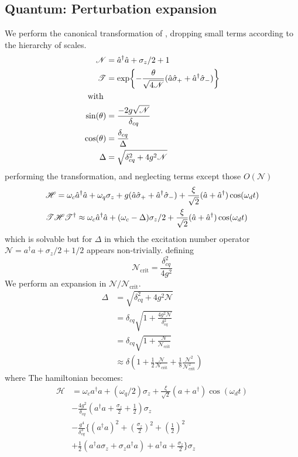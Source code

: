 \subsection{Quantum: Perturbation expansion}
We perform the canonical transformation of \cite{Carbonaro1979}, dropping small terms according to the hierarchy of scales.
\begin{align*}
  \mathscr{N} &= {\hat{a}^\dagger} \hat{a} + \sigma_z/2+ 1\\
  \mathscr{T} &= \exp{-\frac{\theta}{\sqrt{4\mathscr{N}}} (\hat{a}\hat{\sigma}_++ {\hat{a}^\dagger}\hat{\sigma}_-)}\\
  \text{with }&\\
  \sin(\theta) &= \frac{-2g\sqrt{\mathscr{N}}}{\delta_{cq}}\\
  \cos(\theta) &= \frac{\delta_{cq}}{\Delta}\\
  \Delta &= \sqrt{\delta_{cq}^2+4g^2 \mathscr{N}}
\end{align*}
performing the transformation, and neglecting terms except those $O\left(\mathscr{N}\right)$
\begin{align*}
  &\mathscr{H} = \omega_c {\hat{a}^\dagger} \hat{a} + \omega_q \sigma_z + g(\hat{a}\hat{\sigma}_+ + {\hat{a}^\dagger} \hat{\sigma}_-) + \frac{\xi}{\sqrt{2}} (\hat{a} + {\hat{a}^\dagger} ) \cos(\omega_d t) \\
  &\mathscr{T}\mathscr{H}\mathscr{T}^\dagger \approx \omega_c {\hat{a}^\dagger} \hat{a} + ( \omega_c - \Delta ) \sigma_z /2 + \frac{\xi}{\sqrt{2}} (\hat{a} + {\hat{a}^\dagger} ) \cos(\omega_d t)
\end{align*}
which is solvable but for $\Delta$ in which the excitation number operator $\mathscr{N} = a ^ \dagger a + \sigma_z/2 + 1/2$ appears non-trivially. 
defining
\begin{equation}
    \mathscr{N}_{\text{crit}} = \frac{\delta_{cq}^2}{4g^2}
\end{equation}
We perform an expansion in $\mathscr{N}/\mathscr{N}_{\text{crit}}$.
\begin{align}
    \Delta &= \sqrt{\delta_{cq}^2 + 4g^2 \mathscr{N}}\\
           &= \delta_{cq} \sqrt{1 + \frac{4g^2\mathscr{N}}{\delta_{cq}^2}}\\
           &= \delta_{cq} \sqrt{1 + \frac{\mathscr{N}}{\mathscr{N}_{\text{crit}}}}\\
           & \approx \delta \left(
             1
             + \frac{1}{2}\frac{\mathscr{N}}{\mathscr{N}_{\text{crit}}}
           + \frac{1}{8} \frac{\mathscr{N}^2}{\mathscr{N}^2_{\text{crit}}}
             \right)
\end{align}
where 
The hamiltonian becomes:
\begin{align}
    \mathscr{H} &= \omega_c a ^ \dagger a
    + (\omega_q/2) \sigma_z
    +  \frac{\xi}{\sqrt{2}} (a + a^\dagger) \cos(\omega_d t)\\
    &- \frac{4g^2}{\delta_{cq}}\left(a^\dagger a 
    +  \frac{\sigma_z}{2} + \frac{1}{2}\right)\sigma_z\\
    &- \frac{g^4}{\delta_{cq}^3}\Big\{
    \left(a^\dagger a\right)^2
    + \left(\frac{\sigma_z}{2}\right)^2
    + \left(\frac{1}{2}\right)^2\\
    &+ \frac{1}{2} \left(
                    a^\dagger a \sigma_z + \sigma_z a^\dagger a
                  \right)
    + a^\dagger a + \frac{\sigma_z}{2}
    \Big\} 
    \sigma_z
\end{align}
